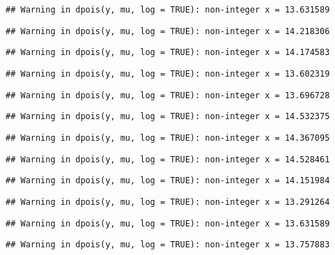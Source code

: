 \documentclass[
]{article}
\begin{document}
\begin{verbatim}
## Warning in dpois(y, mu, log = TRUE): non-integer x = 13.631589
\end{verbatim}

\begin{verbatim}
## Warning in dpois(y, mu, log = TRUE): non-integer x = 14.218306
\end{verbatim}

\begin{verbatim}
## Warning in dpois(y, mu, log = TRUE): non-integer x = 14.174583
\end{verbatim}

\begin{verbatim}
## Warning in dpois(y, mu, log = TRUE): non-integer x = 13.602319
\end{verbatim}

\begin{verbatim}
## Warning in dpois(y, mu, log = TRUE): non-integer x = 13.696728
\end{verbatim}

\begin{verbatim}
## Warning in dpois(y, mu, log = TRUE): non-integer x = 14.532375
\end{verbatim}

\begin{verbatim}
## Warning in dpois(y, mu, log = TRUE): non-integer x = 14.367095
\end{verbatim}

\begin{verbatim}
## Warning in dpois(y, mu, log = TRUE): non-integer x = 14.528461
\end{verbatim}

\begin{verbatim}
## Warning in dpois(y, mu, log = TRUE): non-integer x = 14.151984
\end{verbatim}

\begin{verbatim}
## Warning in dpois(y, mu, log = TRUE): non-integer x = 13.291264
\end{verbatim}

\begin{verbatim}
## Warning in dpois(y, mu, log = TRUE): non-integer x = 13.631589
\end{verbatim}

\begin{verbatim}
## Warning in dpois(y, mu, log = TRUE): non-integer x = 13.757883
\end{verbatim}
\end{document}
